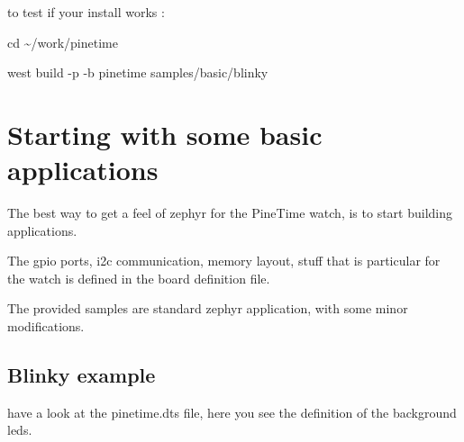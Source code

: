 \documentclass[letterpaper,10pt,english]{sphinxmanual}
\begin{document}
to test if your install works :

cd \textasciitilde{}/work/pinetime

west build -p -b pinetime samples/basic/blinky



\chapter{Starting with some basic applications}
\label{\detokenize{basicapplications:starting-with-some-basic-applications}}\label{\detokenize{basicapplications::doc}}
The best way to get a feel of zephyr for the PineTime watch, is to start building applications.

The gpio ports, i2c communication, memory layout, stuff that is particular for the watch is defined in the board definition file.

The provided samples are standard zephyr application, with some minor modifications.


\section{Blinky    example}
\label{\detokenize{basicapplications:blinky-example}}
\begin{sphinxVerbatim}[commandchars=\\\{\}]
                

           

          
\end{sphinxVerbatim}

have a look at the pinetime.dts file, here you see the definition of the background leds.

\end{document}
